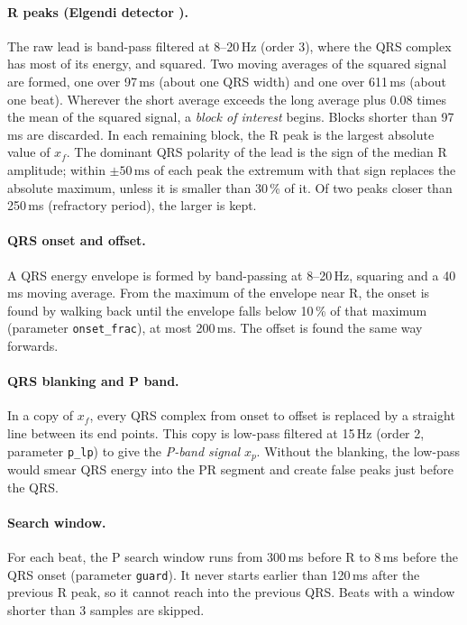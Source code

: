 \documentclass[11pt,a4paper]{article}
\newcommand{\code}[1]{\texttt{#1}}
\newcommand{\ms}{\,\mathrm{ms}}
\begin{document}
\paragraph{R peaks (Elgendi detector \cite{elgendi2013}).} The raw lead is band-pass filtered at 8--20\,Hz (order 3), where the QRS complex has most of its energy, and squared. Two moving averages of the squared signal are formed, one over 97\,ms (about one QRS width) and one over 611\,ms (about one beat). Wherever the short average exceeds the long average plus $0.08$ times the mean of the squared signal, a \emph{block of interest} begins. Blocks shorter than 97\,ms are discarded. In each remaining block, the R peak is the largest absolute value of $x_f$. The dominant QRS polarity of the lead is the sign of the median R amplitude; within $\pm50\ms$ of each peak the extremum with that sign replaces the absolute maximum, unless it is smaller than 30\,\% of it. Of two peaks closer than 250\,ms (refractory period), the larger is kept.

\paragraph{QRS onset and offset.} A QRS energy envelope is formed by band-passing at 8--20\,Hz, squaring and a 40\,ms moving average. From the maximum of the envelope near R, the onset is found by walking back until the envelope falls below 10\,\% of that maximum (parameter \code{onset\_frac}), at most 200\,ms. The offset is found the same way forwards.

\paragraph{QRS blanking and P band.} In a copy of $x_f$, every QRS complex from onset to offset is replaced by a straight line between its end points. This copy is low-pass filtered at 15\,Hz (order 2, parameter \code{p\_lp}) to give the \emph{P-band signal} $x_p$. Without the blanking, the low-pass would smear QRS energy into the PR segment and create false peaks just before the QRS.

\paragraph{Search window.} For each beat, the P search window runs from 300\,ms before R to 8\,ms before the QRS onset (parameter \code{guard}). It never starts earlier than 120\,ms after the previous R peak, so it cannot reach into the previous QRS. Beats with a window shorter than 3 samples are skipped.
\end{document}
